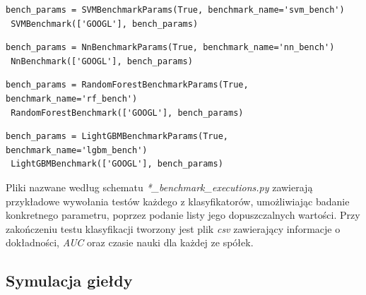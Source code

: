 \documentclass[a4paper, twoside, 11pt, openright]{article}
\begin{document}
\begin{lstlisting}[caption={Przykładowe wywołanie testu dla modelu \textit{SVM} (plik \textit{svm\_benchmark.py})}, label={code:svm},frame=single, captionpos=b, mathescape=true]
 bench_params = SVMBenchmarkParams(True, benchmark_name='svm_bench')
 SVMBenchmark(['GOOGL'], bench_params)
\end{lstlisting}

\begin{lstlisting}[caption={Przykładowe wywołanie testu dla modelu sieci neuronowej (plik \textit{nn\_benchmark.py})}, label={code:mlp},frame=single, captionpos=b, mathescape=true]
 bench_params = NnBenchmarkParams(True, benchmark_name='nn_bench')
 NnBenchmark(['GOOGL'], bench_params)
\end{lstlisting}

\begin{lstlisting}[caption={Przykładowe wywołanie testu dla modelu lasu losowego (plik \textit{rf\_benchmark.py})}, label={code:rf},frame=single, captionpos=b, mathescape=true]
 bench_params = RandomForestBenchmarkParams(True, benchmark_name='rf_bench')
 RandomForestBenchmark(['GOOGL'], bench_params)
\end{lstlisting}

\begin{lstlisting}[caption={Przykładowe wywołanie testu dla modelu \textit{Light GBM} (plik \textit{lgbm\_benchmark.py})}, label={code:lgbm},frame=single, captionpos=b, mathescape=true]
 bench_params = LightGBMBenchmarkParams(True, benchmark_name='lgbm_bench')
 LightGBMBenchmark(['GOOGL'], bench_params)
\end{lstlisting}

 Pliki nazwane według schematu \textit{*\_benchmark\_executions.py} zawierają przykładowe wywołania testów każdego z klasyfikatorów, umożliwiając badanie konkretnego parametru, poprzez podanie listy jego dopuszczalnych wartości. Przy zakończeniu testu klasyfikacji tworzony jest plik \textit{csv} zawierający informacje o dokładności, \textit{AUC} oraz czasie nauki dla każdej ze spółek.

\subsection*{Symulacja giełdy}
\end{document}
